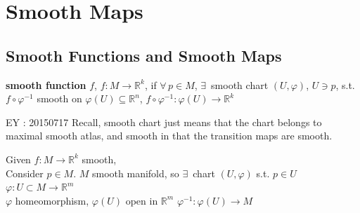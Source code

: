 \section{Smooth Maps}
 

\subsection*{Smooth Functions and Smooth Maps}

\begin{definition}
 \textbf{smooth function } $f$, $f:M \to \mathbb{R}^k$, if $\forall \, p \in M$,  $\exists \, $ smooth chart $(U,\varphi)$, $U \ni p$, s.t. $f\circ \varphi^{-1}$ smooth on $\varphi(U) \subseteq \mathbb{R}^n$, $f\circ \varphi^{-1}: \varphi(U) \to \mathbb{R}^k$
\end{definition}
EY : 20150717 Recall, smooth chart just means that the chart belongs to maximal smooth atlas, and smooth in that the transition maps are smooth.  





 Given $f: M \to \mathbb{R}^k$ smooth, \\
Consider $p \in M$.  $M$ smooth manifold, so $\exists \, $ chart $(U,\varphi)$ s.t. $p \in U$ \\
$\varphi : U \subset M \to \mathbb{R}^m$ \\
$\varphi$ homeomorphism, $\varphi(U)$ open in $\mathbb{R}^m$  
$\varphi^{-1}: \varphi(U) \to M$

